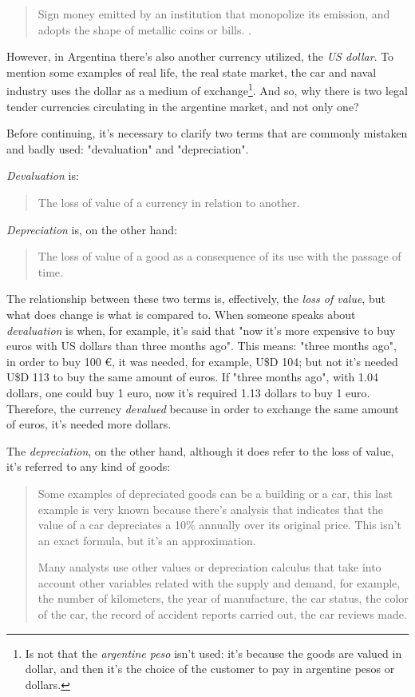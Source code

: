 \documentclass[12pt,a4paper,twoside]{book}
\begin{document}
\begin{quotation}
Sign money emitted by an institution that monopolize its emission, and adopts the shape of metallic coins or bills. \cite[p. 267]{mochobeker}.
\end{quotation}

However, in Argentina there's also another currency utilized, the \textit{US dollar}. To mention some examples of real life, the real state market, the car and naval industry uses the dollar as a medium of exchange\footnote{Is not that the \textit{argentine peso} isn't used: it's because the goods are valued in dollar, and then it's the choice of the customer to pay in argentine pesos or dollars.}. And so, why there is two legal tender currencies circulating in the argentine market, and not only one?

Before continuing, it's necessary to clarify two terms that are commonly mistaken and badly used: "devaluation" and "depreciation".

\textit{Devaluation} is:

\begin{quote}
The loss of value of a currency in relation to another. \cite{epedia:deval}
\end{quote}

\textit{Depreciation} is, on the other hand:

\begin{quote}
The loss of value of a good as a consequence of its use with the passage of time. \cite{epedia:depr}
\end{quote}

The relationship between these two terms is, effectively, the \textit{loss of value}, but what does change is what is compared to. When someone speaks about \textit{devaluation} is when, for example, it's said that "now it's more expensive to buy euros with US dollars than three months ago". This means: "three months ago", in order to buy 100 €, it was needed, for example, U\$D 104; but not it's needed U\$D 113 to buy the same amount of euros. If "three months ago", with 1.04 dollars, one could buy 1 euro, now it's required 1.13 dollars to buy 1 euro. Therefore, the currency \textit{devalued} because in order to exchange the same amount of euros, it's needed more dollars.

The \textit{depreciation}, on the other hand, although it does refer to the loss of value, it's referred to any kind of goods:

\begin{quotation}
Some examples of depreciated goods can be a building or a car, this last example is very known because there's analysis that indicates that the value of a car depreciates a 10\% annually over its original price. This isn't an exact formula, but it's an approximation.

Many analysts use other values or depreciation calculus that take into account other variables related with the supply and demand, for example, the number of kilometers, the year of manufacture, the car status, the color of the car, the record of accident reports carried out, the car reviews made. \cite{epedia:depr}
\end{quotation}
\end{document}
